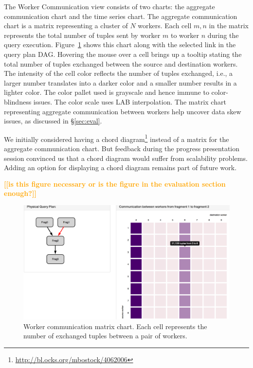 \documentclass{chi2009}
\newcommand{\todo}[1]{\textsf{\textbf{\textcolor{Orange}{[[#1]]}}}}
\begin{document}
The Worker Communication view consists of two charts: the aggregate communication
chart and the time series chart. The aggregate communication chart is a matrix representing
a cluster of $N$ workers. Each cell $m,n$ in the matrix represents the total number of tuples sent
by worker $m$ to worker $n$ during the query execution. Figure~\ref{fig:matrix} shows this chart along
with the selected link in the query plan DAG. Hovering the mouse over a cell brings up a tooltip
stating the total number of tuples exchanged between the source and destination workers. The intensity
of the cell color reflects the number of tuples exchanged, i.e., a larger number translates into a darker color
and a smaller number results in a lighter color. The color pallet used is grayscale and hence
immune to color-blindness issues. The color scale uses LAB interpolation.
The matrix chart representing aggregate communication
between workers help uncover data skew issues, as discussed in \S \ref{sec:eval}.

We initially considered having a chord diagram\footnote{\url{http://bl.ocks.org/mbostock/4062006}} instead of a matrix
for the aggregate communication chart. But feedback during the progress presentation session convinced us that
a chord diagram would suffer from scalability problems. Adding an option for displaying a chord diagram remains
part of future work.

\todo{is this figure necessary or is the figure in the evaluation section enough?}

\begin{figure}[!ht]
  \includegraphics[width=\columnwidth]{images/networkVis1}
  \caption{Worker communication matrix chart. Each cell represents the number of exchanged tuples between a
  pair of workers.}
  \label{fig:matrix}
\end{figure}
\end{document}

